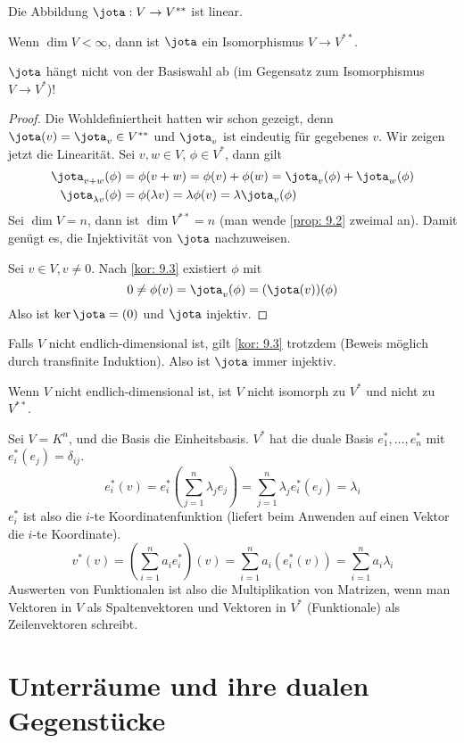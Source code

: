 \documentclass{mycourse}
\begin{document}
\begin{thm}
\label{thm:9.5}
Die Abbildung $\jota: V\to V^{**}$ ist linear.

Wenn $\dim V<\infty$, dann ist $\jota$ ein Isomorphismus $V\to V^{**}$.
\begin{note}
	$\jota$ hängt nicht von der Basiswahl ab (im Gegensatz zum Isomorphismus $V\to V^*$)!
\end{note}
\begin{proof}
	Die Wohldefiniertheit hatten wir schon gezeigt, denn $\jota(v) = \jota_v \in V^{**}$ und $\jota_v$ ist eindeutig für gegebenes $v$.
	Wir zeigen jetzt die Linearität. 
	Sei $v,w\in V$, $\phi\in V^*$, dann gilt
\begin{align*}
\jota_{v+w}(\phi)&=\phi(v+w)=\phi(v)+\phi(w)=\jota_v(\phi)+\jota_w(\phi)\\
\jota_{\lambda v}(\phi) &= \phi(\lambda v) = \lambda \phi(v) = \lambda \jota_v(\phi)
\end{align*}
Sei $\dim V=n$, dann ist $\dim V^{**}=n$ (man wende \ref{prop: 9.2} zweimal an).
Damit genügt es, die Injektivität von $\jota$ nachzuweisen.

Sei $v\in V, v\neq 0$.
Nach \ref{kor: 9.3} existiert $\phi$ mit 
\[
	0 \neq \phi(v) = \jota_v(\phi) = (\jota(v))(\phi)
\]
Also ist $\ker \jota = (0)$ und $\jota$ injektiv.
\end{proof}
\begin{note}
Falls $V$ nicht endlich-dimensional ist, gilt \ref{kor: 9.3} trotzdem (Beweis möglich durch transfinite Induktion).
Also ist $\jota$ immer injektiv.

Wenn $V$ nicht endlich-dimensional ist, ist $V$ nicht isomorph zu $V^*$ und nicht zu $V^{**}$.
\end{note}
\end{thm}

Sei $V=K^n$, und die Basis die Einheitsbasis.
$V^*$ hat die duale Basis $e_1^*,\dotsc,e_n^*$ mit $e_i^*(e_j)=\delta_{ij}$.
\[
e_i^*(v)=e_i^*\left (\sum_{j=1}^n\lambda_je_j\right )=\sum_{j=1}^n\lambda_je_i^*(e_j)=\lambda_i
\]
$e_i^*$ ist also die $i$-te Koordinatenfunktion (liefert beim Anwenden auf einen Vektor die $i$-te Koordinate).
\[
	v^*(v)=\left(\sum_{i=1}^na_ie_i^*\right)(v)=\sum_{i=1}^na_i(e_i^*(v))=\sum_{i=1}^n a_i\lambda_i
\]
Auswerten von Funktionalen ist also die Multiplikation von Matrizen, wenn man
Vektoren in $V$ als Spaltenvektoren und Vektoren in $V^*$ (Funktionale) als Zeilenvektoren schreibt.

\section{Unterräume und ihre dualen Gegenstücke}
\end{document}
